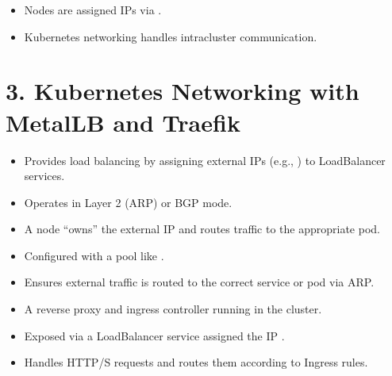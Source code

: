 \documentclass[letterpaper,10pt,english]{sphinxmanual}
\begin{document}
\sphinxAtStartPar
{}
\begin{itemize}
\item {} 
\sphinxAtStartPar
Nodes are assigned IPs via .

\item {} 
\sphinxAtStartPar
Kubernetes networking handles intra\sphinxhyphen{}cluster communication.

\end{itemize}


\section{3. Kubernetes Networking with MetalLB and Traefik}
\label{\detokenize{setup:kubernetes-networking-with-metallb-and-traefik}}
\sphinxAtStartPar
{}
\begin{itemize}
\item {} 
\sphinxAtStartPar
Provides load balancing by assigning external IPs (e.g., ) to LoadBalancer services.

\item {} 
\sphinxAtStartPar
Operates in Layer 2 (ARP) or BGP mode.

\item {} 
\sphinxAtStartPar
A node “owns” the external IP and routes traffic to the appropriate pod.

\end{itemize}

\sphinxAtStartPar
{}
\begin{itemize}
\item {} 
\sphinxAtStartPar
Configured with a pool like .

\item {} 
\sphinxAtStartPar
Ensures external traffic is routed to the correct service or pod via ARP.

\end{itemize}

\sphinxAtStartPar
{}
\begin{itemize}
\item {} 
\sphinxAtStartPar
A reverse proxy and ingress controller running in the cluster.

\item {} 
\sphinxAtStartPar
Exposed via a LoadBalancer service assigned the IP .

\item {} 
\sphinxAtStartPar
Handles HTTP/S requests and routes them according to Ingress rules.

\end{itemize}
\end{document}
